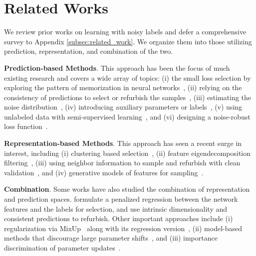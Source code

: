 \documentclass{article}
\theoremstyle{plain}
\theoremstyle{definition}
\theoremstyle{remark}
\begin{document}
\section{Related Works}\label{sec:related_works}
\vskip -0.05in
We review prior works on learning with noisy labels and defer a comprehensive survey to Appendix \ref{subsec:related_work}. %
We organize them into those utilizing prediction, representation, and combination of the two.

\textbf{Prediction-based Methods}.
This approach has been the focus of much existing research and covers a wide array of topics: (i) 
the small loss selection by exploring the pattern of memorization in neural networks~\citep{han18coteaching, arazo19}, 
(ii) relying on the consistency of predictions to select or refurbish the samples~\citep{liu2020early,huang2020self},
(iii) estimating the noise distribution~\citep{patrini17,hendrycks18nips},
(iv) introducing auxiliary parameters or labels~\citep{pleiss20aum,hu20rdiaux},
(v) using unlabeled data with semi-supervised learning~\citep{li2020dividemix,bai2021understanding,karim2022unicon}, 
and (vi) designing a noise-robust loss function~\citep{menon20phuber,wang19sce}.

\textbf{Representation-based Methods}.
This approach has seen a recent surge in interest, including
(i) clustering based selection~\citep{mirzasoleiman20crust,wu20topo},
(ii) feature eigendecomposition filtering~\citep{kim21fine}, %
(iii) using neighbor information to sample and refurbish with clean validation~\citep{li22neighbor, gao16knn},
and (iv) generative models of features for sampling~\citep{kmlee19}.

\textbf{Combination}.
Some works have also studied the combination of representation and prediction spaces.
\citet{wang22spr} formulate a penalized regression between the network features and the labels for selection,
and \citet{ma18d2l} use intrinsic dimensionality and consistent predictions to refurbish.
Other important approaches include (i) regularization via MixUp~\citep{zhang18mixup} along with its regression version~\citep{yao22cmixup},
(ii) model-based methods that discourage large parameter shifts~\citep{hu20rdiaux}, and (iii) importance discrimination of parameter updates~\citep{xia21cdr}.
\end{document}
